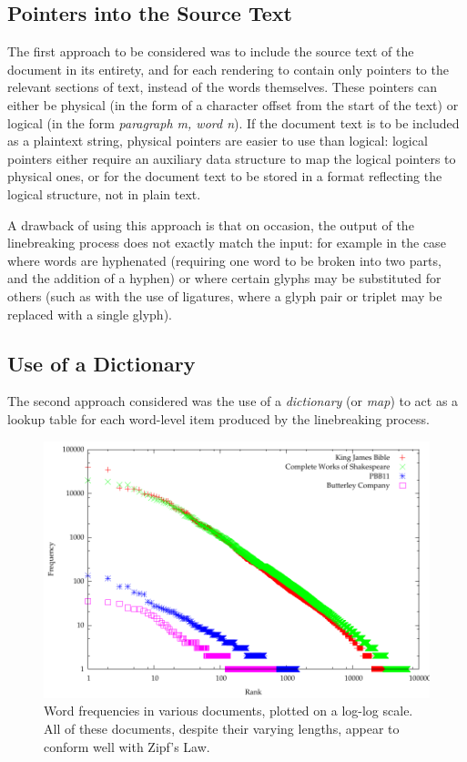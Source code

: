 \subsection{Pointers into the Source Text}
The first approach to be considered was to include the source text of the document in its entirety, and for each rendering to contain only pointers to the relevant sections of text, instead of the words themselves. These pointers can either be physical (in the form of a character offset from the start of the text) or logical (in the form \emph{paragraph m, word n}). If the document text is to be included as a plaintext string, physical pointers are easier to use than logical: logical pointers either require an auxiliary data structure to map the logical pointers to physical ones, or for the document text to be stored in a format reflecting the logical structure, \ie{} not in plain text.

A drawback of using this approach is that on occasion, the output of the linebreaking process does not exactly match the input: for example in the case where words are hyphenated (requiring one word to be broken into two parts, and the addition of a hyphen) or where certain glyphs may be substituted for others (such as with the use of ligatures, where a glyph pair or triplet may be replaced with a single glyph).



\subsection{Use of a Dictionary}
The second approach considered was the use of a \emph{dictionary} (or \emph{map}) to act as a lookup table for each word-level item produced by the linebreaking process.

\begin{figure}
  \begin{center}
  \includegraphics[width=\textwidth]{gfx/wordfreq}
  \end{center}
  \caption[Word frequencies in various documents]{Word frequencies in various documents, plotted on a log-log scale. All of these documents, despite their varying lengths, appear to conform well with Zipf's Law. }
  \label{fig:wordfreq}
\end{figure}

